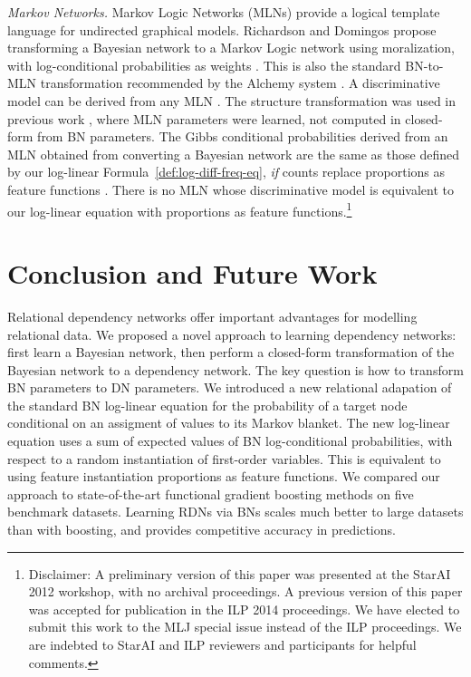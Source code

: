 \documentclass[runningheads,a4paper]{llncs}
\begin{document}
\emph{Markov Networks.} Markov Logic Networks (MLNs) provide a logical template language for undirected graphical models. 
Richardson and Domingos propose transforming a Bayesian network to a Markov Logic network using moralization, with log-conditional probabilities as weights \cite{Domingos2009}. 
This is also the standard BN-to-MLN transformation recommended by the Alchemy system \cite{bib:bayes-convert}. A discriminative model can be derived from any MLN \cite{Domingos2009}.  The structure transformation was used in previous work \cite{Schulte2012}, where MLN parameters were learned, not computed in closed-form from BN parameters. The Gibbs conditional probabilities derived from an MLN obtained from converting a Bayesian network are the same as those defined by our log-linear Formula~\ref{def:log-diff-freq-eq}, {\em if} counts replace proportions as feature functions \cite{Schulte2011}. There is no MLN whose discriminative model is equivalent to our log-linear equation with  proportions as feature functions.\footnote{Disclaimer: A preliminary version of this paper was presented at the StarAI 2012 workshop, with no archival proceedings. A previous version of this paper was accepted for publication in the ILP 2014 proceedings. We have elected to submit this work to the MLJ special issue instead of the ILP proceedings. We are indebted to StarAI and ILP reviewers and participants for helpful comments.}
 

\section{Conclusion and Future Work} 
\label{sec:conclusion}
Relational dependency networks offer important advantages for modelling relational data. We proposed a novel approach to learning dependency networks: first learn a Bayesian network, then perform a closed-form transformation of the Bayesian network to a dependency network. The key question is how to transform BN parameters to DN parameters. We introduced a new relational adapation of the standard BN log-linear equation for the probability of a target node conditional on an assigment of values to its Markov blanket. The new log-linear equation uses a sum of expected values of BN log-conditional probabilities, with respect to a random instantiation of first-order variables. This is equivalent to using feature instantiation proportions as feature functions. We compared our approach to state-of-the-art functional gradient boosting methods  on five benchmark datasets. Learning RDNs via BNs scales much better to large datasets than with boosting, and provides competitive accuracy in predictions.
\end{document}
